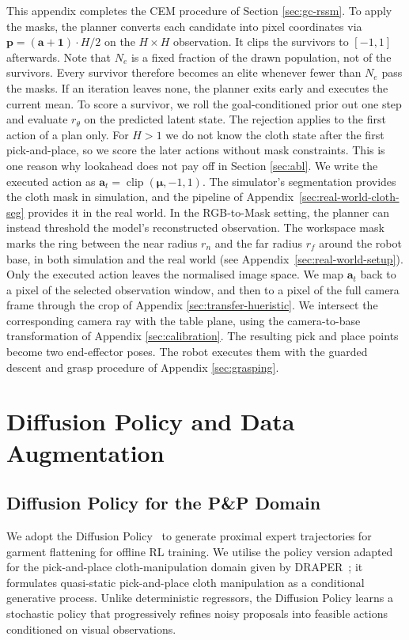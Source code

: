 \documentclass[journal]{IEEEtran}
\newif\ifshowrev\showrevtrue
\newcommand{\rev}[1]{\ifshowrev\textcolor{revblue}{#1}\else#1\fi}
\begin{document}
\rev{This appendix completes the CEM procedure of Section \ref{sec:gc-rssm}. To apply the masks, the planner converts each candidate into pixel coordinates via $\bm{p} = (\bm{a}+\bm{1})\cdot H/2$ on the $H\times H$ observation. It clips the survivors to $[-1,1]$ afterwards. Note that $N_e$ is a fixed fraction of the drawn population, not of the survivors. Every survivor therefore becomes an elite whenever fewer than $N_e$ pass the masks. If an iteration leaves none, the planner exits early and executes the current mean. To score a survivor, we roll the goal-conditioned prior out one step and evaluate $r_\theta$ on the predicted latent state. The rejection applies to the first action of a plan only. For $H>1$ we do not know the cloth state after the first pick-and-place, so we score the later actions without mask constraints. This is one reason why lookahead does not pay off in Section \ref{sec:abl}. We write the executed action as $\bm{a}_t = \operatorname{clip}(\bm{\mu}, -1, 1)$. The simulator's segmentation provides the cloth mask in simulation, and the pipeline of Appendix~\ref{sec:real-world-cloth-seg} provides it in the real world. In the RGB-to-Mask setting, the planner can instead threshold the model's reconstructed observation. The workspace mask marks the ring between the near radius $r_n$ and the far radius $r_f$ around the robot base, in both simulation and the real world (see Appendix~\ref{sec:real-world-setup}). Only the executed action leaves the normalised image space. We map $\bm{a}_t$ back to a pixel of the selected observation window, and then to a pixel of the full camera frame through the crop of Appendix \ref{sec:transfer-hueristic}. We intersect the corresponding camera ray with the table plane, using the camera-to-base transformation of Appendix \ref{sec:calibration}. The resulting pick and place points become two end-effector poses. The robot executes them with the guarded descent and grasp procedure of Appendix \ref{sec:grasping}.}

\section{Diffusion Policy and Data Augmentation}

\subsection{Diffusion Policy for the P\&P Domain} \label{sec:diffusion}

We adopt the Diffusion Policy~\cite{chi2023diffusionpolicy} to generate proximal expert trajectories for garment flattening for offline RL training. We utilise the policy version adapted for the pick-and-place cloth-manipulation domain given by \textsc{DRAPER}~\cite{kadi2025draper}; it formulates quasi-static pick-and-place cloth manipulation as a conditional generative process. Unlike deterministic regressors, the Diffusion Policy learns a stochastic policy that progressively refines noisy proposals into feasible actions conditioned on visual observations.
\end{document}
